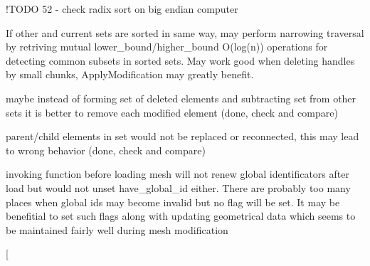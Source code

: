 \begin{DoxyRefList}
\begin{DoxyEnumerate}
\end{DoxyEnumerate}
\item[\label{todo__todo000009}%
\hypertarget{todo__todo000009}{}%
Member \hyperlink{classINMOST_1_1ElementSet_a96676712005ce12f0c1f9a92c6ac095d}{I\-N\-M\-O\-S\-T\-:\-:Element\-Set\-:\-:Sort\-Set} (Comparator\-Type comp) const ]!\-T\-O\-D\-O 52 -\/ check radix sort on big endian computer  
\item[\label{todo__todo000008}%
\hypertarget{todo__todo000008}{}%
Member \hyperlink{classINMOST_1_1ElementSet_a1aafea0ac742bcc3ec1873621ca41ccd}{I\-N\-M\-O\-S\-T\-:\-:Element\-Set\-:\-:Subtract} (const Element\-Set \&other) const ]If other and current sets are sorted in same way, may perform narrowing traversal by retriving mutual lower\-\_\-bound/higher\-\_\-bound O(log(n)) operations for detecting common subsets in sorted sets. May work good when deleting handles by small chunks, Apply\-Modification may greatly benefit.  
\item[\label{todo__todo000019}%
\hypertarget{todo__todo000019}{}%
Member \hyperlink{classINMOST_1_1Mesh_a1f53070855f3503b2f4cefc16cedd6a0}{I\-N\-M\-O\-S\-T\-:\-:Mesh\-:\-:Apply\-Modification} ()]
\begin{DoxyEnumerate}
\item maybe instead of forming set of deleted elements and subtracting set from other sets it is better to remove each modified element (done, check and compare)
\item parent/child elements in set would not be replaced or reconnected, this may lead to wrong behavior (done, check and compare)  
\end{DoxyEnumerate}
\item[\label{todo__todo000011}%
\hypertarget{todo__todo000011}{}%
Member \hyperlink{classINMOST_1_1Mesh_ae39e30b11f35de81d2a9b8451ef87391}{I\-N\-M\-O\-S\-T\-:\-:Mesh\-:\-:Assign\-Global\-I\-D} (Element\-Type mask)]
\begin{DoxyEnumerate}
\item invoking function before loading mesh will not renew global identificators after load but would not unset have\-\_\-global\-\_\-id either. There are probably too many places when global ids may become invalid but no flag will be set. It may be benefitial to set such flags along with updating geometrical data which seems to be maintained fairly well during mesh modification  
\end{DoxyEnumerate}
\item[\label{todo__todo000020}%
\hypertarget{todo__todo000020}{}%

\end{DoxyRefList}
